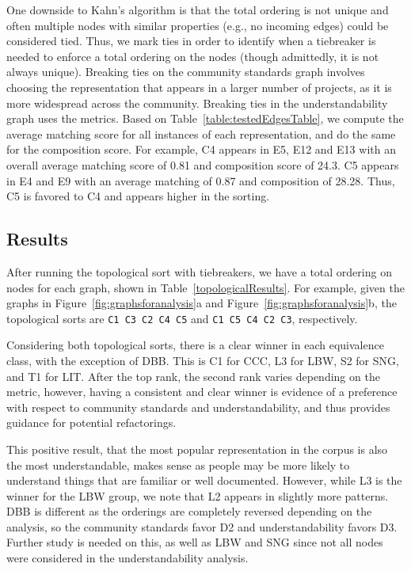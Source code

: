 One downside to Kahn's algorithm is that the total ordering is not unique and often multiple nodes with similar properties (e.g., no incoming edges) could be considered tied. Thus, we mark ties in order to identify when a tiebreaker is needed to enforce a total ordering on the nodes (though admittedly, it is not always unique). 
Breaking ties on the community standards graph involves choosing the representation that appears in a larger number of projects, as it is more widespread across the community. 
Breaking ties in the understandability graph uses the metrics. Based on Table~\ref{table:testedEdgesTable}, we compute the average matching score for all instances of each representation, and do the same for the composition score. For example, C4 appears in E5, E12 and E13 with an overall average matching score of 0.81 and composition score of 24.3. C5 appears in E4 and E9 with an average matching of 0.87 and composition of 28.28. Thus, C5 is favored to C4 and appears higher in the sorting.

\subsection{Results}
After running the topological sort with tiebreakers, we have a total ordering on nodes for each graph, shown in Table~\ref{topologicalResults}.  For example, given the graphs in Figure~\ref{fig:graphsforanalysis}a and Figure~\ref{fig:graphsforanalysis}b, the topological sorts are {\tt C1 C3 C2 C4 C5} and {\tt C1 C5 C4 C2 C3}, respectively.



Considering both topological sorts, there is a clear winner in each equivalence class, with the exception of DBB.
This is C1 for CCC, L3 for LBW, S2 for SNG, and T1 for LIT.
After the top rank, the second rank varies depending on the metric, however, having a consistent and clear winner is evidence of a preference with respect to community standards and understandability, and thus provides guidance for potential refactorings.

This positive result, that the most popular representation in the corpus is also the most understandable, makes sense as people may be more likely to understand things that are familiar or well documented. However, while L3 is the winner for the LBW group, we note that L2 appears in slightly more patterns.
DBB is different  as the orderings are completely reversed depending on the analysis, so the community standards favor D2 and understandability favors D3. Further study is needed on this, as well as  LBW and SNG since not all nodes were considered in the understandability analysis. 


